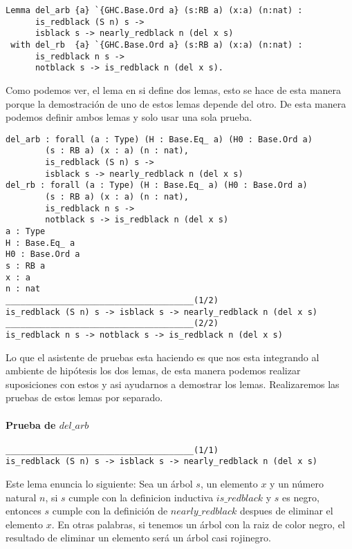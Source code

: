 \begin{verbatim}
Lemma del_arb {a} `{GHC.Base.Ord a} (s:RB a) (x:a) (n:nat) :
      is_redblack (S n) s ->
      isblack s -> nearly_redblack n (del x s)
 with del_rb  {a} `{GHC.Base.Ord a} (s:RB a) (x:a) (n:nat) :
      is_redblack n s ->
      notblack s -> is_redblack n (del x s).
\end{verbatim}

Como podemos ver, el lema en si define dos lemas, esto se hace de esta manera porque la
demostraci\'on de uno de estos lemas depende del otro. De esta manera podemos definir ambos lemas y
solo usar una sola prueba.

\begin{verbatim}
del_arb : forall (a : Type) (H : Base.Eq_ a) (H0 : Base.Ord a)
        (s : RB a) (x : a) (n : nat),
        is_redblack (S n) s ->
        isblack s -> nearly_redblack n (del x s)
del_rb : forall (a : Type) (H : Base.Eq_ a) (H0 : Base.Ord a)
        (s : RB a) (x : a) (n : nat),
        is_redblack n s ->
        notblack s -> is_redblack n (del x s)
a : Type
H : Base.Eq_ a
H0 : Base.Ord a
s : RB a
x : a
n : nat
______________________________________(1/2)
is_redblack (S n) s -> isblack s -> nearly_redblack n (del x s)
______________________________________(2/2)
is_redblack n s -> notblack s -> is_redblack n (del x s)
\end{verbatim}

Lo que el asistente de pruebas esta haciendo es que nos esta integrando al ambiente de hip\'otesis
los dos lemas, de esta manera podemos realizar suposiciones con estos y asi ayudarnos a demostrar
los lemas. Realizaremos las pruebas de estos lemas por separado.

\paragraph{Prueba de $del\_arb$}

\begin{verbatim}
______________________________________(1/1)
is_redblack (S n) s -> isblack s -> nearly_redblack n (del x s)
\end{verbatim}

Este lema enuncia lo siguiente: Sea un \'arbol $s$, un elemento $x$ y un n\'umero natural $n$, si
$s$ cumple con la definicion inductiva $is\_redblack$ y $s$ es negro, entonces $s$ cumple con la
definición de $nearly\_redblack$ despues de eliminar el elemento $x$. En otras palabras, si tenemos
un \'arbol con la raiz de color negro, el resultado de eliminar un elemento ser\'a un \'arbol casi
 rojinegro.

